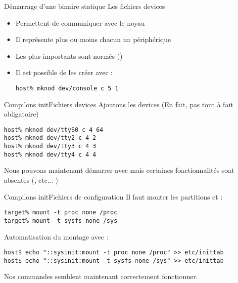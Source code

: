 \begin{frame}[fragile=singleslide]{Démarrage d'une binaire statique}
  Les fichiers devices
  \begin{itemize}
  \item Permettent de communiquer avec le noyau
  \item Il représente plus ou moins chacun un périphérique
  \item       Les       plus        importants       sont       normés
    ()
  \item Il est possible de les créer avec :
    \begin{lstlisting}
host% mknod dev/console c 5 1
    \end{lstlisting}
  \end{itemize}
\end{frame}

\begin{frame}[fragile=singleslide]{Compilons init}{Fichiers devices}
  Ajoutons  les devices    (En fait,  pas  tout à  fait
  obligatoire)
  \begin{lstlisting}
host% mknod dev/ttyS0 c 4 64
host% mknod dev/tty2 c 4 2
host% mknod dev/tty3 c 4 3
host% mknod dev/tty4 c 4 4
  \end{lstlisting}
  Nous  pouvons  maintenant  démarrer avec    mais
  certaines fonctionnalités sont absentes (, etc... )
\end{frame}


\begin{frame}[fragile=singleslide]{Compilons init}{Fichiers de configuration}
  Il faut monter les partitions  et :
  \begin{lstlisting}
target% mount -t proc none /proc 
target% mount -t sysfs none /sys
  \end{lstlisting}
  Automatisation du montage avec :
  \begin{lstlisting}
host$ echo "::sysinit:mount -t proc none /proc" >> etc/inittab 
host$ echo "::sysinit:mount -t sysfs none /sys" >> etc/inittab 
  \end{lstlisting}
  Nos commandes semblent maintenant correctement fonctionner.
\end{frame}

